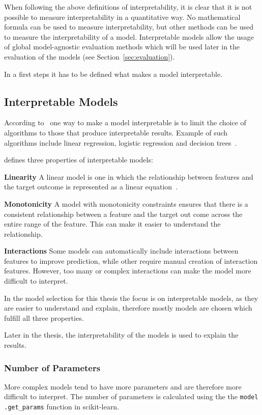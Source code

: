 When following the above definitions of interpretability, it is clear that it
is not possible to
measure interpretability in a quantitative way.
No mathematical formula can be used to measure interpretability, but other
methods can be used to
measure the interpretability of a model.
Interpretable models allow the usage of global model-agnostic evaluation
methods which will be
used later in the evaluation of the models (see Section~\ref{sec:evaluation}).

In a first steps it has to be defined what makes a model interpretable.

\subsection*{Interpretable Models}
According to~\cite{molnar2020interpretable} one way to make a model
interpretable is to limit the
choice of algorithms to those that produce interpretable results. Example of
such
algorithms include linear regression, logistic regression and decision
trees~\cite[p.
35]{molnar2020interpretable}.

\cite{molnar2020interpretable} defines three properties of interpretable models:

\textbf{Linearity} A linear model is one in which the relationship between
features and the
target outcome is represented as a linear
equation~\cite[]{molnar2020interpretable}.

\textbf{Monotonicity} A model with monotonicity constraints ensures that
there is a consistent
relationship between a feature and the target out come across the entire
range of the feature.
This can make it easier to understand the relationship.

\textbf{Interactions} Some models can automatically include
interactions between features to improve prediction, while other require
manual creation of
interaction features.
However, too many or complex interactions can make the model more
difficult to interpret.

In the model selection for this thesis the focus is on interpretable models,
as they are easier to
understand and explain, therefore mostly models are chosen which fulfill all
three
properties.

Later in the thesis, the interpretability of the models is used to explain
the results.

\subsubsection*{Number of Parameters}
More complex models tend to have more parameters and are therefore more
difficult to interpret.
The number of parameters is calculated using the the \texttt{model
.get\_params} function
in scikit-learn.

